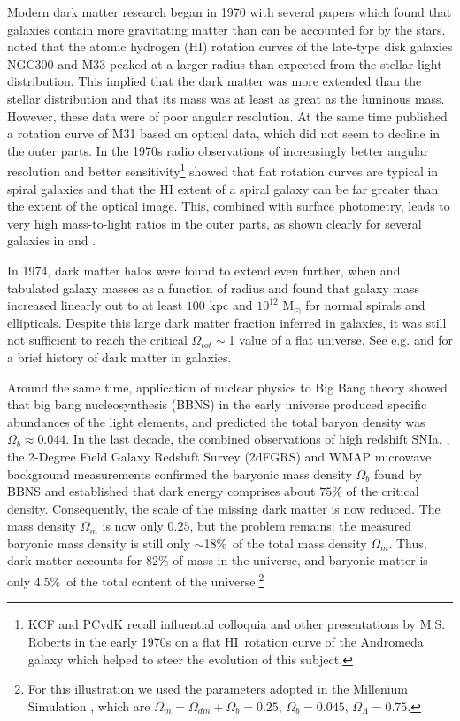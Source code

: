 \documentclass[traditabstract]{aa} %
\newcommand\HI{H{\small I}}
\begin{document}
Modern dark matter research began in 1970 with several papers
which found that galaxies contain more gravitating matter than can
be accounted for by the stars.  \citet{freeman1970} noted
that the atomic hydrogen (\HI) rotation curves of the late-type disk
galaxies NGC300 and M33 peaked at a larger radius than expected
from the stellar light distribution. This implied that the dark
matter was more extended than the stellar distribution and that its
mass was at least as great as the luminous mass. 
However, these data were of poor angular
resolution. At the same time \citet{rubin1970} published a rotation
curve of M31 based on optical data, which did not seem to decline in 
the outer parts.
In the 1970s radio observations of increasingly better angular
resolution and better sensitivity\footnote{KCF and PCvdK recall 
influential colloquia and other presentations by M.S. Roberts 
in the early 1970s on a flat \HI\ rotation curve of the Andromeda galaxy
which helped to steer the evolution of this subject.}  
 showed that flat rotation curves
are typical in spiral galaxies \citep{shostak1971,rs1972,rr1973,bosma1978}
and that the HI extent of a spiral galaxy can be far greater than
the extent of the optical image. This, combined with surface
photometry, leads to very high mass-to-light ratios in the outer 
parts, as shown clearly for several galaxies in \citet{bosma1978} and
\citet{bk1979}.


In 1974, dark
matter halos were found to extend even further, when \citet{oyp1974}
and \citet{eks1974} tabulated galaxy masses as a function of radius
and found that galaxy mass increased linearly out
to at least $100$ kpc and $10^{12}$ M$_{\odot }$ for normal spirals
and ellipticals.  Despite this large dark matter fraction inferred
in galaxies, it was still not sufficient to reach the critical
$\Omega_{tot}\sim$1 value of a flat universe.  See e.g. 
\citet{sr01} and \citet{rob2008}
for a brief history of dark matter in galaxies.

Around the same time, application of nuclear physics to Big Bang
theory showed that big bang nucleosynthesis (BBNS) in the early 
universe produced specific abundances of the light
elements, and predicted the total baryon density was $\Omega_b
\approx 0.044$.  
In the last decade, the combined observations of high redshift SNIa,
\citep{reissetal1998,perlmutteretal1999}, the 2-Degree Field Galaxy
Redshift Survey (2dFGRS) \citep{percivaletal2001} and WMAP microwave 
background measurements \citep{spergel_wmap2003} confirmed the baryonic 
mass density $\Omega_b$ found by BBNS and established
that dark energy comprises about $75\%$ of the critical density.  
Consequently, the scale of the missing
dark matter is now reduced. The mass density $\Omega_m$ is now only
$0.25$, but the problem remains: the measured baryonic mass density
is still only $\sim$18\%\ of the total mass density $\Omega_m$.  
Thus, dark matter accounts for $82\%$ of mass in the universe, and 
baryonic matter is only 4.5\%\ of the total content of the 
universe.\footnote{For this illustration we used the
parameters adopted in the Millenium Simulation \citep{swjetal2005}, 
which are $\Omega_m = \Omega_{dm} + \Omega_b = 0.25$, $\Omega_b = 0.045$,
$\Omega_{\Lambda} = 0.75$.} 
\end{document}
